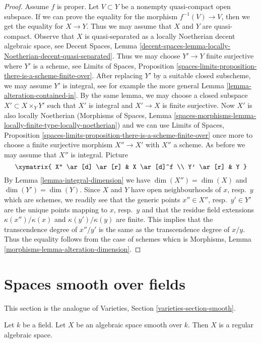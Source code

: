 \begin{proof}
\medskip\noindent
Assume $f$ is proper.
Let $V \subset Y$ be a nonempty quasi-compact open subspace.
If we can prove the equality for the morphism $f^{-1}(V) \to V$,
then we get the equality for $X \to Y$. Thus we may assume that
$X$ and $Y$ are quasi-compact.
Observe that $X$ is quasi-separated as
a locally Noetherian decent algebraic space, see
Decent Spaces, Lemma
\ref{decent-spaces-lemma-locally-Noetherian-decent-quasi-separated}.
Thus we may choose $Y' \to Y$ finite surjective where $Y'$
is a scheme, see Limits of Spaces, Proposition
\ref{spaces-limits-proposition-there-is-a-scheme-finite-over}.
After replacing $Y'$ by a suitable closed subscheme, we
may assume $Y'$ is integral, see for example the more general
Lemma \ref{lemma-alteration-contained-in}.
By the same lemma, we may choose a closed subspace
$X' \subset X \times_Y Y'$ such that $X'$ is integral
and $X' \to X$ is finite surjective.
Now $X'$ is also locally Noetherian
(Morphisms of Spaces, Lemma
\ref{spaces-morphisms-lemma-locally-finite-type-locally-noetherian})
and we can use Limits of Spaces, Proposition
\ref{spaces-limits-proposition-there-is-a-scheme-finite-over}
once more to choose a finite surjective morphism $X'' \to X'$
with $X''$ a scheme. As before we may assume that $X''$
is integral. Picture
$$
\xymatrix{
X'' \ar[d] \ar[r] & X \ar[d]^f \\
Y' \ar[r] & Y
}
$$
By Lemma \ref{lemma-integral-dimension} we have $\dim(X'') = \dim(X)$
and $\dim(Y') = \dim(Y)$. Since $X$ and $Y$ have open neighbourhoods
of $x$, resp.\ $y$ which are schemes, we readily see that the generic
points $x'' \in X''$, resp.\ $y' \in Y'$ are the unique points mapping
to $x$, resp.\ $y$ and that the residue field extensions
$\kappa(x'')/\kappa(x)$ and $\kappa(y')/\kappa(y)$ are finite.
This implies that the transcendence degree of $x''/y'$ is the
same as the transcendence degree of $x/y$. Thus the equality follows
from the case of schemes whicn is
Morphisms, Lemma \ref{morphisms-lemma-alteration-dimension}.
\end{proof}





\section{Spaces smooth over fields}
\label{section-smooth}

\noindent
This section is the analogue of
Varieties, Section \ref{varieties-section-smooth}.

\begin{lemma}
\label{lemma-smooth-regular}
Let $k$ be a field.
Let $X$ be an algebraic space smooth over $k$.
Then $X$ is a regular algebraic space.
\end{lemma}

